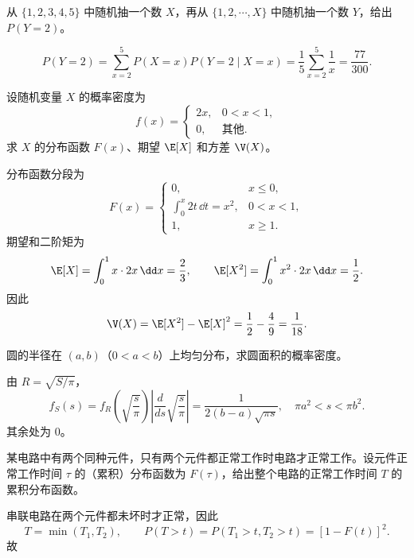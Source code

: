 
\begin{question}
从 $\{1,2,3,4,5\}$ 中随机抽一个数 $X$，再从 $\{1,2,\cdots,X\}$ 中随机抽一个数 $Y$，给出 $P(Y=2)$。
\begin{solution}
\[
P(Y=2)=\sum_{x=2}^{5}P(X=x)P(Y=2\mid X=x)
=\frac15\sum_{x=2}^{5}\frac1x
=\frac{77}{300}.
\]
\end{solution}
\end{question}

\begin{question}
设随机变量 $X$ 的概率密度为
\[
f(x)=\begin{cases}
2x,&0<x<1,\\
0,&\text{其他}.
\end{cases}
\]
求 $X$ 的分布函数 $F(x)$、期望 $\E[X]$ 和方差 $\V(X)$。
\begin{solution}
分布函数分段为
\[
F(x)=\begin{cases}
0,&x\le 0,\\
\displaystyle\int_0^x2t\,\dd t=x^2,&0<x<1,\\
1,&x\ge 1.
\end{cases}
\]
期望和二阶矩为
\[
\E[X]=\int_0^1x\cdot2x\,\dd x=\frac23,
\qquad
\E[X^2]=\int_0^1x^2\cdot2x\,\dd x=\frac12.
\]
因此
\[
\V(X)=\E[X^2]-\E[X]^2=\frac12-\frac49=\frac1{18}.
\]
\end{solution}
\end{question}

\begin{question}
圆的半径在 $(a,b)$（$0<a<b$）上均匀分布，求圆面积的概率密度。
\begin{solution}
由 $R=\sqrt{S/\pi}$，
\[
 f_S(s)=f_R\!\left(\sqrt{\frac{s}{\pi}}\right)\left|\frac{d}{ds}\sqrt{\frac{s}{\pi}}\right|
 =\frac{1}{2(b-a)\sqrt{\pi s}},
\quad \pi a^2<s<\pi b^2.
\]
其余处为 $0$。
\end{solution}
\end{question}

\begin{question}
某电路中有两个同种元件，只有两个元件都正常工作时电路才正常工作。设元件正常工作时间 $\tau$ 的（累积）分布函数为 $F(\tau)$，给出整个电路的正常工作时间 $T$ 的累积分布函数。
\begin{solution}
串联电路在两个元件都未坏时才正常，因此
\[
T=\min(T_1,T_2),\qquad
P(T>t)=P(T_1>t,T_2>t)=[1-F(t)]^2.
\]
故

\end{solution}
\end{question}

